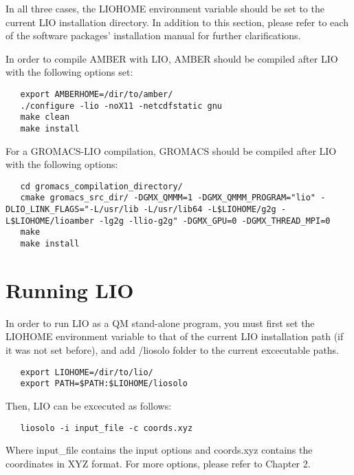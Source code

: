 In all three cases, the \textcolor{lioteal}{LIOHOME} environment variable 
should be set to the current LIO installation directory. In addition to 
this section, please refer to each of the software packages' installation
manual for further clarifications.

In order to compile AMBER with LIO, AMBER should be compiled after LIO with the
following options set:

\begin{lstlisting}
   export AMBERHOME=/dir/to/amber/
   ./configure -lio -noX11 -netcdfstatic gnu
   make clean
   make install
\end{lstlisting}

For a GROMACS-LIO compilation, GROMACS should be compiled after LIO with the 
following options:

\begin{lstlisting}
   cd gromacs_compilation_directory/
   cmake gromacs_src_dir/ -DGMX_QMMM=1 -DGMX_QMMM_PROGRAM="lio" -DLIO_LINK_FLAGS="-L/usr/lib -L/usr/lib64 -L$LIOHOME/g2g -L$LIOHOME/lioamber -lg2g -llio-g2g" -DGMX_GPU=0 -DGMX_THREAD_MPI=0
   make
   make install
\end{lstlisting}

\section{Running LIO}
In order to run LIO as a QM stand-alone program, you must first set the 
\textcolor{lioteal}{LIOHOME} environment variable to that of the current 
LIO installation path (if it was not set before), and add /liosolo folder
to the current excecutable paths.

\begin{lstlisting}
   export LIOHOME=/dir/to/lio/
   export PATH=$PATH:$LIOHOME/liosolo
\end{lstlisting}

Then, LIO can be excecuted as follows:
\begin{lstlisting}
   liosolo -i input_file -c coords.xyz
\end{lstlisting}
Where input\_file contains the input options and coords.xyz contains the 
coordinates in XYZ format. For more options, please refer to Chapter 2.


